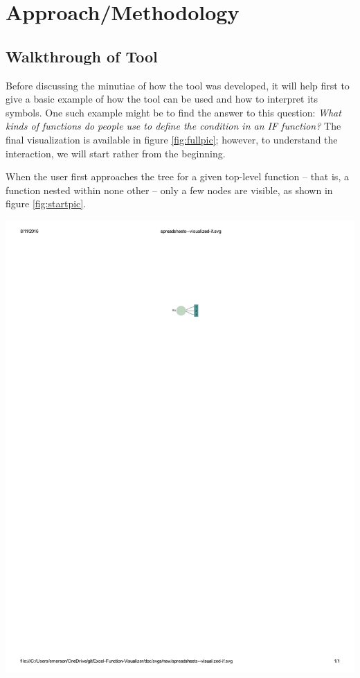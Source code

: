 \documentclass[conference]{IEEEtran}
\begin{document}
\section{Approach/Methodology}
\subsection{Walkthrough of Tool}
Before discussing the minutiae of how the tool was developed, it will help first to give a basic example of how the
tool can be used and how to interpret its symbols. One such example might be to find the answer to this question: \textit{
	What kinds of functions do people use to define the condition in an IF function?} The final visualization is available
in figure \ref{fig:fullpic}; however, to understand the interaction, we will start rather from the beginning. \par
When the user first approaches the tree for a given top-level function -- that is, a function nested within none other -- only a few nodes are visible, as shown in figure \ref{fig:startpic}. \par 

\centerline{\includegraphics{start}}
\end{document}
